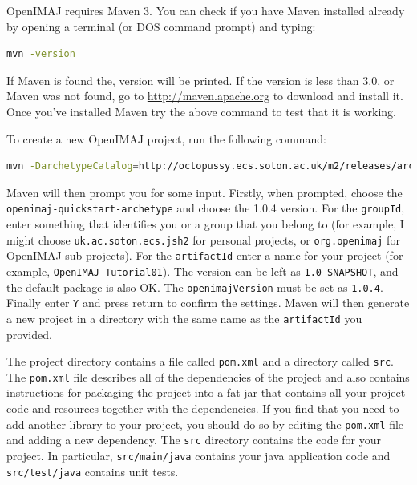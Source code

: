 \documentclass[10pt,a4paper,twoside,extrafontsizes]{memoir}
\begin{document}
OpenIMAJ requires Maven 3. You can check if you have Maven installed already 
by opening a terminal (or DOS command prompt) and typing:
\begin{lstlisting}[language=bash]
mvn -version
\end{lstlisting}
If Maven is found the, version will be printed. If the version is less than 3.0, 
or Maven was not found, go to \url{http://maven.apache.org} to download and 
install it. Once you've installed Maven try the above command to test that it 
is working.

To create a new OpenIMAJ project, run the following command:
\begin{lstlisting}[language=bash]
mvn -DarchetypeCatalog=http://octopussy.ecs.soton.ac.uk/m2/releases/archetype-catalog.xml archetype:generate
\end{lstlisting}

Maven will then prompt you for some input.  Firstly, when prompted, choose 
the \texttt{openimaj-quickstart-archetype} and choose the 1.0.4 version. For the \verb+groupId+, 
enter something that identifies you or a group that you belong to (for example, I might choose 
\verb+uk.ac.soton.ecs.jsh2+ for personal projects, or \verb+org.openimaj+ for OpenIMAJ sub-projects). 
For the \verb+artifactId+ enter a name for your project (for example, \verb+OpenIMAJ-Tutorial01+). The 
version can be left as \verb+1.0-SNAPSHOT+, and the default package is also OK. The 
\verb+openimajVersion+ must be set as \verb+1.0.4+. Finally enter \verb+Y+ and press return
to confirm the settings. Maven will then generate a new project in a directory with the same 
name as the \verb+artifactId+ you provided.

The project directory contains a file called \verb+pom.xml+ and a directory called \verb+src+. 
The \verb+pom.xml+ file describes all of the dependencies of the project and also contains 
instructions for packaging the project into a fat jar that contains all your project code and 
resources together with the dependencies. If you find that you need to add another library to 
your project, you should do so by editing the \verb+pom.xml+ file and adding a new dependency. 
The \verb+src+ directory contains the code for your project. In particular, \verb+src/main/java+ 
contains your java application code and \verb+src/test/java+ contains unit tests.
\end{document}
